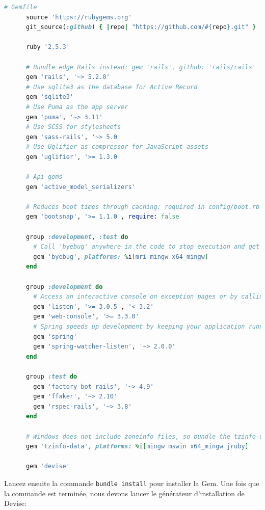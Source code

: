 \documentclass[]{report}
\begin{document}
    \begin{scriptsize}
      \begin{lstlisting}[language=ruby, caption={Le Gemfile avec l'ajout de Devise}, label={lst:add_devise_to_gemfile}]
      # Gemfile
      source 'https://rubygems.org'
      git_source(:github) { |repo| "https://github.com/#{repo}.git" }

      ruby '2.5.3'

      # Bundle edge Rails instead: gem 'rails', github: 'rails/rails'
      gem 'rails', '~> 5.2.0'
      # Use sqlite3 as the database for Active Record
      gem 'sqlite3'
      # Use Puma as the app server
      gem 'puma', '~> 3.11'
      # Use SCSS for stylesheets
      gem 'sass-rails', '~> 5.0'
      # Use Uglifier as compressor for JavaScript assets
      gem 'uglifier', '>= 1.3.0'

      # Api gems
      gem 'active_model_serializers'

      # Reduces boot times through caching; required in config/boot.rb
      gem 'bootsnap', '>= 1.1.0', require: false

      group :development, :test do
        # Call 'byebug' anywhere in the code to stop execution and get a debugger console
        gem 'byebug', platforms: %i[mri mingw x64_mingw]
      end

      group :development do
        # Access an interactive console on exception pages or by calling 'console' anywhere in the code.
        gem 'listen', '>= 3.0.5', '< 3.2'
        gem 'web-console', '>= 3.3.0'
        # Spring speeds up development by keeping your application running in the background. Read more: https://github.com/rails/spring
        gem 'spring'
        gem 'spring-watcher-listen', '~> 2.0.0'
      end

      group :test do
        gem 'factory_bot_rails', '~> 4.9'
        gem 'ffaker', '~> 2.10'
        gem 'rspec-rails', '~> 3.8'
      end

      # Windows does not include zoneinfo files, so bundle the tzinfo-data gem
      gem 'tzinfo-data', platforms: %i[mingw mswin x64_mingw jruby]

      gem 'devise'
      \end{lstlisting}
    \end{scriptsize}

    Lancez ensuite la commande \verb|bundle install| pour installer la Gem. Une fois que la commande est terminée, nous devons lancer le générateur d'installation de Devise:
\end{document}

